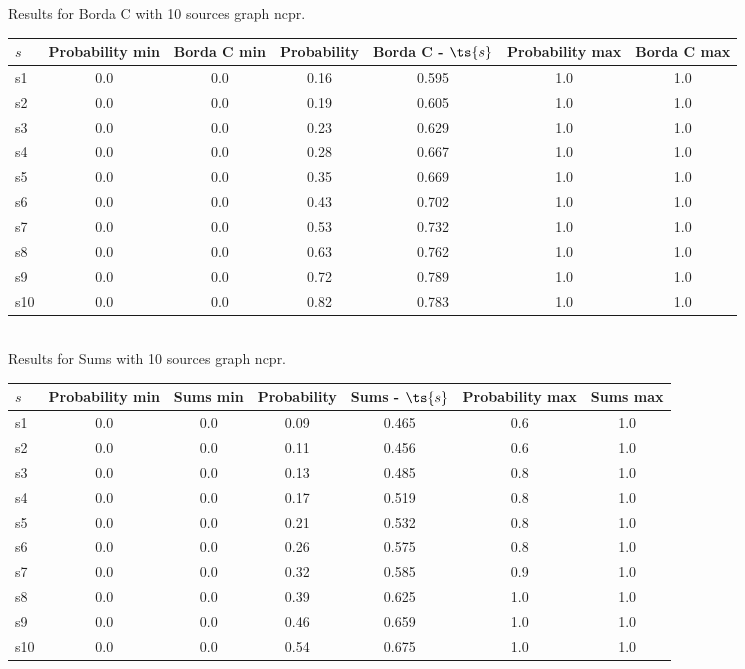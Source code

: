 \documentclass{article}
\begin{document}
\noindent Results for Borda C with 10 sources graph ncpr.

\noindent\begin{tabular}{|l|c|c|c|c|c|c|}
\hline
$s$& Probability min & Borda C min & Probability & Borda C - $\ts{s}$ & Probability max & Borda C max\\
\hline
s1 &0.0 & 0.0 & 0.16 & 0.595 & 1.0 & 1.0\\
\hline
s2 &0.0 & 0.0 & 0.19 & 0.605 & 1.0 & 1.0\\
\hline
s3 &0.0 & 0.0 & 0.23 & 0.629 & 1.0 & 1.0\\
\hline
s4 &0.0 & 0.0 & 0.28 & 0.667 & 1.0 & 1.0\\
\hline
s5 &0.0 & 0.0 & 0.35 & 0.669 & 1.0 & 1.0\\
\hline
s6 &0.0 & 0.0 & 0.43 & 0.702 & 1.0 & 1.0\\
\hline
s7 &0.0 & 0.0 & 0.53 & 0.732 & 1.0 & 1.0\\
\hline
s8 &0.0 & 0.0 & 0.63 & 0.762 & 1.0 & 1.0\\
\hline
s9 &0.0 & 0.0 & 0.72 & 0.789 & 1.0 & 1.0\\
\hline
s10 &0.0 & 0.0 & 0.82 & 0.783 & 1.0 & 1.0\\
\hline
\end{tabular}\\

\noindent Results for Sums with 10 sources graph ncpr.

\noindent\begin{tabular}{|l|c|c|c|c|c|c|}
\hline
$s$& Probability min & Sums min & Probability & Sums - $\ts{s}$ & Probability max & Sums max\\
\hline
s1 &0.0 & 0.0 & 0.09 & 0.465 & 0.6 & 1.0\\
\hline
s2 &0.0 & 0.0 & 0.11 & 0.456 & 0.6 & 1.0\\
\hline
s3 &0.0 & 0.0 & 0.13 & 0.485 & 0.8 & 1.0\\
\hline
s4 &0.0 & 0.0 & 0.17 & 0.519 & 0.8 & 1.0\\
\hline
s5 &0.0 & 0.0 & 0.21 & 0.532 & 0.8 & 1.0\\
\hline
s6 &0.0 & 0.0 & 0.26 & 0.575 & 0.8 & 1.0\\
\hline
s7 &0.0 & 0.0 & 0.32 & 0.585 & 0.9 & 1.0\\
\hline
s8 &0.0 & 0.0 & 0.39 & 0.625 & 1.0 & 1.0\\
\hline
s9 &0.0 & 0.0 & 0.46 & 0.659 & 1.0 & 1.0\\
\hline
s10 &0.0 & 0.0 & 0.54 & 0.675 & 1.0 & 1.0\\
\hline
\end{tabular}\\
\end{document}
